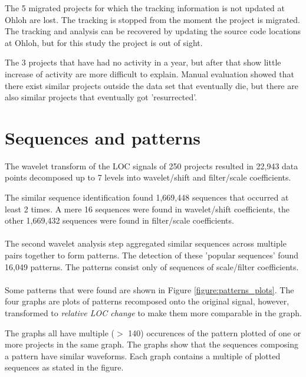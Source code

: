 The 5 migrated projects for which the tracking information is not updated at
Ohloh are lost. The tracking is stopped from the moment the project is
migrated. The tracking and analysis can be recovered by updating the source
code locations at Ohloh, but for this study the project is out of sight.

The 3 projects that have had no activity in a year, but after that show little
increase of activity are more difficult to explain. Manual evaluation showed
that there exist similar projects outside the data set that eventually die, but
there are also similar projects that eventually got 'resurrected'.



\section{Sequences and patterns}
\label{section:seqs_patterns}
The wavelet transform of the LOC signals of 250 projects resulted in 22,943
data points decomposed up to 7 levels into wavelet/shift and filter/scale
coefficients.

The similar sequence identification found 1,669,448 sequences that occurred
at least 2 times. A mere 16 sequences were found in wavelet/shift coefficients,
the other 1,669,432 sequences were found in filter/scale coefficients.

\paragraph{}
The second wavelet analysis step aggregated similar sequences across multiple
pairs together to form patterns. The detection of these 'popular sequences'
found 16,049 patterns. The patterns consist only of sequences of scale/filter
coefficients.

\paragraph{}
Some patterns that were found are shown in Figure \ref{figure:patterns_plots}.
The four graphs are plots of patterns recomposed onto the original signal,
however, transformed to \emph{relative LOC change }\rm to make them more
comparable in the graph.

The graphs all have multiple ($>$ 140) occurences of the pattern plotted of one
or more projects in the same graph. The graphs show that the sequences
composing a pattern have similar waveforms. Each graph contains a multiple of
plotted sequences as stated in the figure.

